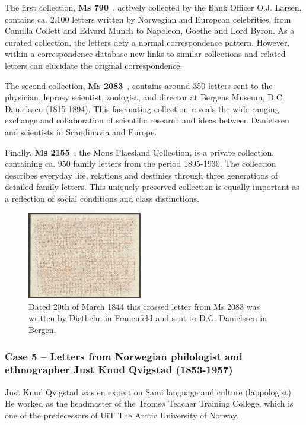 \documentclass[runningheads]{llncs}
\begin{document}
The first collection, \textbf{Ms 790}~\cite{ref_url6},
actively collected by the Bank Officer O.J. Larsen, contains ca. 2.100 letters written by Norwegian and European celebrities, from Camilla
Collett and Edvard Munch to Napoleon, Goethe and Lord Byron. As a
curated collection, the letters defy a normal correspondence
pattern. However, within a correspondence database new links to similar
collections and related letters can elucidate the original correspondence.

The second collection, \textbf{Ms 2083}~\cite{ref_url7},
contains around 350 letters sent to the physician, leprosy scientist,
zoologist, and director at Bergens Museum, D.C. Danielssen (1815-1894).
This fascinating collection reveals the wide-ranging exchange and
collaboration of scientific research and ideas between Danielssen and
scientists in Scandinavia and Europe.

Finally, \textbf{Ms 2155}~\cite{ref_url8}, the Mons Flaesland
Collection, is a private collection, containing ca. 950 family letters
from the period 1895-1930. The collection describes everyday life,
relations and destinies through three generations of detailed family
letters. This uniquely preserved collection is equally important as a
reflection of social conditions and class distinctions.

\begin{figure}[h!]
\centering
\includegraphics[width=50mm]{ubb-ms-2083-b-1-09_Letter_to_DCDanielssen.jpg}
\caption{Dated 20th of March 1844 this crossed letter from Ms 2083 was written by Diethelm in Frauenfeld and sent to D.C. Danielssen in Bergen.} \label{fig7}
\end{figure}

\subsubsection{Case 5 -- Letters from Norwegian philologist and ethnographer Just Knud Qvigstad (1853-1957)}
Just Knud Qvigstad was en expert on Sami language and culture
(lappologist). He worked as the headmaster of the Tromsø Teacher
Training College, which is one of the predecessors of UiT The Arctic
University of Norway.
\end{document}
